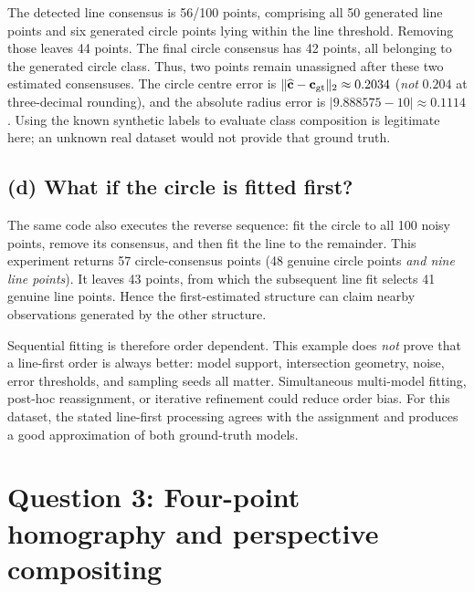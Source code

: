 \documentclass[11pt,a4paper]{article}
\begin{document}
The detected line consensus is 56/100 points, comprising all 50 generated line points and six generated circle points lying within the line threshold. Removing those leaves 44 points. The final circle consensus has 42 points, all belonging to the generated circle class. Thus, two points remain unassigned after these two estimated consensuses. The circle centre error is
$\|\widehat{\mathbf c}-\mathbf{c}_{\rm gt}\|_2\approx0.2034$ (\emph{not} $0.204$ at three-decimal rounding), and the absolute radius error is $|9.888575-10|\approx0.1114$. Using the known synthetic labels to evaluate class composition is legitimate here; an unknown real dataset would not provide that ground truth.

\subsection{(d) What if the circle is fitted first?}
The same code also executes the reverse sequence: fit the circle to all 100 noisy points, remove its consensus, and then fit the line to the remainder. This experiment returns 57 circle-consensus points (48 genuine circle points \emph{and nine line points}). It leaves 43 points, from which the subsequent line fit selects 41 genuine line points. Hence the first-estimated structure can claim nearby observations generated by the other structure.

Sequential fitting is therefore order dependent. This example does \emph{not} prove that a line-first order is always better: model support, intersection geometry, noise, error thresholds, and sampling seeds all matter. Simultaneous multi-model fitting, post-hoc reassignment, or iterative refinement could reduce order bias. For this dataset, the stated line-first processing agrees with the assignment and produces a good approximation of both ground-truth models.

\section{Question 3: Four-point homography and perspective compositing}
\end{document}
